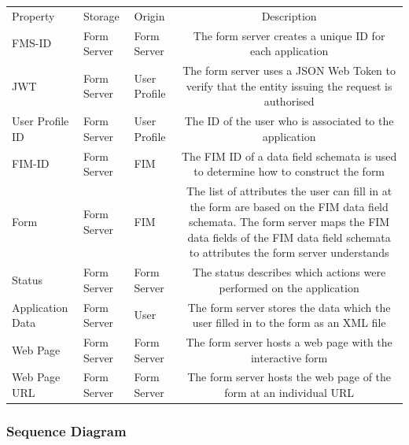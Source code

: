 \documentclass[
     12pt,         %
     a4paper,      %
     BCOR=10mm,version=first,     %
     DIV=14,version=first,        %
     ]{scrreprt}
\begin{document}
\begin{table}[!h]
    \begin{tabularx}{\textwidth}{|l|l|l|C|}
    \hline
     \\
    \hline
    Property & Storage & Origin & Description  \\
    \hline
    \hline
    FMS-ID & Form Server & Form Server & The form server creates a unique ID for each application \\
    \hline
    JWT & Form Server & User Profile & The form server uses a JSON Web Token to verify that the entity issuing the request is authorised \\
    \hline
    User Profile ID & Form Server & User Profile & The ID of the user who is associated to the application \\
    \hline
    FIM-ID & Form Server & FIM & The FIM ID of a data field schemata is used to determine how to construct the form \\
    \hline
    Form & Form Server & FIM & The list of attributes the user can fill in at the form are based on the FIM data field schemata. The form server maps the FIM data fields of the FIM data field schemata to attributes the form server understands \\
    \hline
    Status & Form Server & Form Server & The status describes which actions were performed on the application \\
    \hline
    Application Data & Form Server & User & The form server stores the data which the user filled in to the form as an XML file \\
    \hline
    Web Page & Form Server & Form Server & The form server hosts a web page with the interactive form  \\
    \hline 
    Web Page URL & Form Server & Form Server & The form server hosts the web page of the form at an individual URL \\
    \hline 
    \end{tabularx}
\end{table}

\subsubsection{Sequence Diagram}
\end{document}
